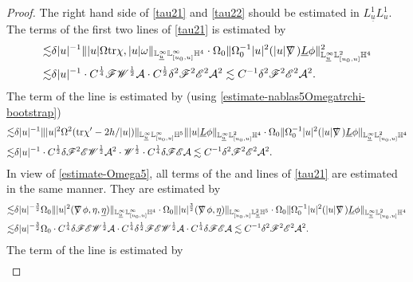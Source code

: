 \documentclass[11pt,reqno]{amsart}
\theoremstyle{definition}
\numberwithin{equation}{section}
\newcommand{\tr}{\mathrm{tr}}
\renewcommand{\L}{\mathbb{L}}
\renewcommand{\H}{\mathbb{H}}
\def\etab{\underline{\eta}}
\def\Lb{\underline{L}}
\def\tr{\mathrm{tr}}
\def\ub{\underline{u}}
\def\nablas{\mbox{$\nabla \mkern -13mu /$ }}
\begin{document}
\begin{proof}
The right hand side of \eqref{tau21} and \eqref{tau22} should be estimated in $L_{\ub}^1L^1_u$. The  terms of the first two lines of \eqref{tau21} is estimated by
\begin{align*}
\lesssim&\delta|u|^{-1}\||u|\Omega\tr\chi, |u|\omega\|_{\L^\infty_{\ub}\L^\infty_{[u_0,u]}\H^4}\cdot\Omega_0\|\Omega_0^{-1}|u|^2(|u|\nablas)\Lb\phi\|^2_{\L^\infty_{\ub}\L^2_{[u_0,u]}\H^4}\\
\lesssim& \delta|u|^{-1}\cdot C^{\frac{1}{4}}\mathscr{F}\mathscr{W}^{\frac{1}{2}}\mathcal{A}\cdot C^{\frac{1}{2}}\delta^2\mathscr{F}^2\mathscr{E}^2\mathcal{A}^2\lesssim C^{-1}\delta^2\mathscr{F}^2\mathscr{E}^2\mathcal{A}^2.
\end{align*}
The  term of the  line is estimated by (using \eqref{estimate-nablas5Omegatrchi-bootstrap})
\begin{align*}
\lesssim&\delta|u|^{-1}\||u|^2\Omega^2(\tr\chi'-2h/|u|)\|_{\L^\infty_{\ub}\L^\infty_{[u_0,u]}\H^5}\||u|\Lb\phi\|_{\L^\infty_{\ub}\L^2_{[u_0,u]}\H^4}\cdot\Omega_0\|\Omega_0^{-1}|u|^2(|u|\nablas)\Lb\phi\|_{\L^\infty_{\ub}\L^2_{[u_0,u]}\H^4}\\
\lesssim& \delta|u|^{-1}\cdot C^{\frac{1}{2}}\delta\mathscr{F}^2\mathscr{E}\mathscr{W}^{\frac{1}{2}}\mathcal{A}^2\cdot \mathscr{W}^{\frac{1}{2}}\cdot C^{\frac{1}{4}}\delta\mathscr{F}\mathscr{E}\mathcal{A}\lesssim C^{-1}\delta^2\mathscr{F}^2\mathscr{E}^2\mathcal{A}^2.
\end{align*}
In view of \eqref{estimate-Omega5}, all terms of the  and  lines of \eqref{tau21} are estimated in the same manner. They are estimated by
\begin{align*}
\lesssim&\delta|u|^{-\frac{3}{2}}\Omega_0\||u|^2(\nablas\phi,\eta, \etab)\|_{\L^\infty_{\ub}\L^\infty_{[u_0,u]}\H^4}\cdot\Omega_0\||u|^\frac{3}{2}(\nablas\phi,\etab)\|_{\L^\infty_{[u_0,u]}\L^2_{\ub}\H^5}\cdot\Omega_0\|\Omega_0^{-1}|u|^2(|u|\nablas)\Lb\phi\|_{\L^\infty_{\ub}\L^2_{[u_0,u]}\H^4}\\
\lesssim&\delta|u|^{-\frac{3}{2}}\Omega_0\cdot C^{\frac{1}{4}}\delta\mathscr{F}\mathscr{E}\mathscr{W}^{\frac{1}{2}}\mathcal{A}\cdot C^{\frac{1}{4}}\delta^{\frac{1}{2}}\mathscr{F}\mathscr{E}\mathscr{W}^{\frac{1}{2}}\mathcal{A}\cdot C^{\frac{1}{4}}\delta\mathscr{F}\mathscr{E}\mathcal{A}\lesssim C^{-1}\delta^2\mathscr{F}^2\mathscr{E}^2\mathcal{A}^2.
\end{align*}
The  term of the  line is estimated by
\begin{align*}

\end{align*}
\end{proof}
\end{document}
